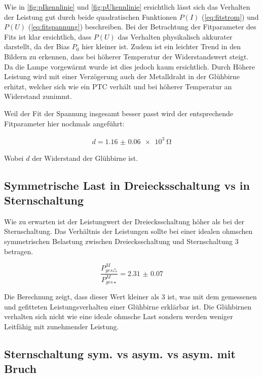 \documentclass[12pt,english,ngerman]{scrartcl}
\begin{document}
Wie in \autoref{fig:pIkennlinie} und \autoref{fig:pUkennlinie} ersichtlich
lässt sich das Verhalten der Leistung gut durch beide quadratischen Funktionen
$P(I)$ (\autoref{eq:fitstrom}) und $P(U)$ (\autoref{eq:fitspannung})
beschreiben. Bei der Betrachtung der Fitparameter des Fits ist klar
ersichtlich, dass $P(U)$ das Verhalten physikalisch akkurater darstellt, da der
Bias $P_0$ hier kleiner ist. Zudem ist ein leichter Trend in den Bildern zu
erkennen, dass bei höherer Temperatur der Widerstandswert steigt. Da die Lampe
vorgewärmt wurde ist dies jedoch kaum ersichtlich. Durch Höhere Leistung wird
mit einer Verzögerung auch der Metalldraht in der Glühbirne erhitzt, welcher
sich wie ein PTC verhält und bei höherer Temperatur an Widerstand zunimmt.

Weil der Fit der Spannung insgesamt besser passt wird der entsprechende
Fitparameter hier nochmals angeführt:

\begin{align}
	d = \SI{1.16(6)e3}{\ohm}
\end{align}

Wobei $d$ der Widerstand der Glühbirne ist.

\subsection{Symmetrische Last in Dreiecksschaltung vs in Sternschaltung}

Wie zu erwarten ist der Leistungwert der Dreiecksschaltung höher als bei der
Sternschaltung. Das Verhältnis der Leistungen sollte bei einer idealen ohmschen
symmetrischen Belastung zwischen Dreiecksschaltung und Sternschaltung 3
betragen.

\begin{equation}
	\frac{P_{ges\triangle}^M}{P_{ges\star}^M} = \num{2.31(7)}
\end{equation}

Die Berechnung zeigt, dass dieser Wert kleiner als 3 ist, was mit dem
gemessenen und gefitteten Leistungsverhalten einer Glühbirne erklärbar ist. Die
Glühbirnen verhalten sich nicht wie eine ideale ohmsche Last sondern werden
weniger Leitfähig mit zunehmender Leistung.

\subsection{Sternschaltung sym. vs asym. vs asym. mit Bruch}
\end{document}
